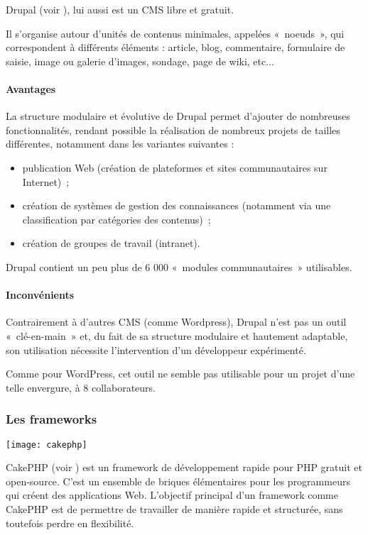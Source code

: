 Drupal (voir \cite{drupal}), lui aussi est un CMS libre et gratuit.

Il s'organise autour d'unités de contenus minimales, appelées «~noeuds~», qui correspondent à différents éléments : article, blog, commentaire, formulaire de saisie, image ou galerie d'images, sondage, page de wiki, etc...

\paragraph{Avantages}
La structure modulaire et évolutive de Drupal permet d'ajouter de nombreuses fonctionnalités, rendant possible la réalisation de nombreux projets de tailles différentes, notamment dans les variantes suivantes : 
\begin{itemize}
    \item publication Web (création de plateformes et sites communautaires sur Internet)~;
    \item création de systèmes de gestion des connaissances (notamment via une classification par catégories des contenus)~;
    \item création de groupes de travail (intranet).
\end{itemize}

Drupal contient un peu plus de 6 000 «~modules communautaires~» utilisables.

\paragraph{Inconvénients}
Contrairement à d'autres CMS (comme Wordpress), Drupal n'est pas un outil «~clé-en-main~» et, du fait de sa structure modulaire et hautement adaptable, son utilisation nécessite l'intervention d'un développeur expérimenté.

Comme pour WordPress, cet outil ne semble pas utilisable pour un projet d'une telle envergure, à 8 collaborateurs.

\subsubsection{Les frameworks}


\begin{center}\texttt{[image: cakephp]}\end{center}

CakePHP (voir \cite{cakephp}) est un framework de développement rapide pour PHP gratuit et open-source.
C’est un ensemble de briques élémentaires pour les programmeurs qui créent des applications Web. L'objectif principal d'un framework comme CakePHP est de permettre de travailler de manière rapide et structurée, sans toutefois perdre en flexibilité.

